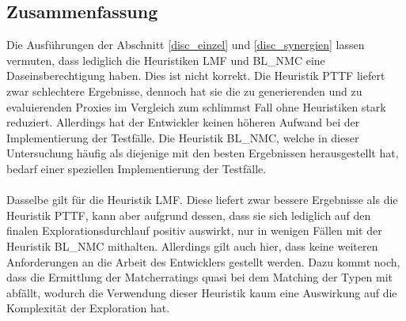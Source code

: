 \subsection{Zusammenfassung}
Die Ausführungen der Abschnitt \ref{disc_einzel} und \ref{disc_synergien} lassen vermuten, dass lediglich die Heuristiken LMF und BL\_NMC eine Daseinsberechtigung haben. Dies ist nicht korrekt. Die Heuristik PTTF liefert zwar schlechtere Ergebnisse, dennoch hat sie die zu generierenden und zu evaluierenden Proxies im Vergleich zum schlimmst Fall ohne Heuristiken stark reduziert. Allerdings hat der Entwickler keinen höheren Aufwand bei der Implementierung der Testfälle. Die Heuristik BL\_NMC, welche in dieser Untersuchung häufig als diejenige mit den besten Ergebnissen herausgestellt hat, bedarf einer speziellen Implementierung der Testfälle.
\\\\
Dasselbe gilt für die Heuristik LMF. Diese liefert zwar bessere Ergebnisse als die Heuristik PTTF, kann aber aufgrund dessen, dass sie sich lediglich auf den finalen Explorationsdurchlauf positiv auswirkt, nur in wenigen Fällen mit der Heuristik BL\_NMC mithalten. Allerdings gilt auch hier, dass keine weiteren Anforderungen an die Arbeit des Entwicklers gestellt werden. Dazu kommt noch, dass die Ermittlung der Matcherratings quasi bei dem Matching der Typen mit abfällt, wodurch die Verwendung dieser Heuristik kaum eine Auswirkung auf die Komplexität der Exploration hat.

